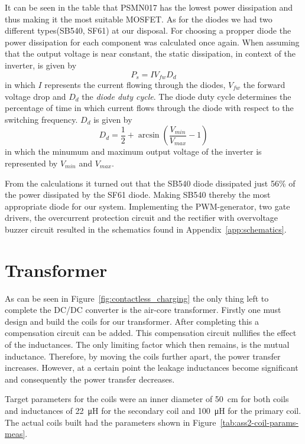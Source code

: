 \documentclass[11pt,titlepage]{report}
\begin{document}
It can be seen in the table that PSMN017 has the lowest power dissipation and thus making it the most suitable MOSFET. As for the diodes we had two different types(SB540, SF61) at our disposal. For choosing a propper diode the power dissipation for each component was calculated once again. When assuming that the output voltage is near constant, the static dissipation, in context of the inverter, is given by
\begin{equation}
	P_s = I V_{fw} D_{d}
\end{equation}
in which $I$ represents the current flowing through the diodes, $V_{fw}$ the forward voltage drop and $D_{d}$ the \textit{diode duty cycle}. The diode duty cycle determines the percentage of time in which current flows through the diode with respect to the switching frequency. $D_{d}$ is given by
\begin{equation}
	D_d = \frac{1}{2}+\arcsin{ \left( \frac{V_{min}}{V_{max}}-1 \right) }
\end{equation}
in which the minumum and maximum output voltage of the inverter is represented by $V_{min}$ and $V_{max}$.

From the calculations it turned out that the SB540 diode dissipated just 56\% of the power dissipated by the SF61 diode. Making SB540 thereby the most appropriate diode for our system. Implementing the PWM-generator, two gate drivers, the overcurrent protection circuit and the rectifier
with overvoltage buzzer circuit resulted in the schematics found in Appendix~\ref{app:schematics}.

\section{Transformer}
As can be seen in Figure~\ref{fig:contactless_charging} the only thing left to complete the DC/DC converter is the air-core transformer. Firstly one must design and build the coils for our transformer. After completing this a compensation circuit can be added. This compensation circuit nullifies the effect of the inductances. The only limiting factor which then remains, is the mutual inductance. Therefore, by moving the coils further apart, the power transfer increases. However, at a certain point the leakage inductances become significant and consequently the power transfer decreases.

Target parameters for the coils were an inner diameter of \SI{50}{cm} for both coils and inductances of \SI{22}{μH} for the secondary coil and \SI{100}{μH} for the primary coil. The actual coils built had the parameters shown in Figure~\ref{tab:ass2-coil-params-meas}.
\end{document}
